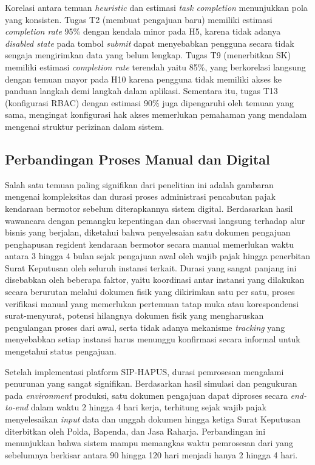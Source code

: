 \documentclass[conference]{IEEEtran}
\begin{document}
Korelasi antara temuan \emph{heuristic} dan estimasi \emph{task completion} menunjukkan
pola yang konsisten. Tugas T2 (membuat pengajuan baru) memiliki estimasi \emph{completion
rate} 95\% dengan kendala minor pada H5, karena tidak adanya \emph{disabled state} pada
tombol \emph{submit} dapat menyebabkan pengguna secara tidak sengaja mengirimkan data
yang belum lengkap. Tugas T9 (menerbitkan SK) memiliki estimasi \emph{completion rate}
terendah yaitu 85\%, yang berkorelasi langsung dengan temuan mayor pada H10 karena
pengguna tidak memiliki akses ke panduan langkah demi langkah dalam aplikasi. Sementara
itu, tugas T13 (konfigurasi RBAC) dengan estimasi 90\% juga dipengaruhi oleh temuan
yang sama, mengingat konfigurasi hak akses memerlukan pemahaman yang mendalam mengenai
struktur perizinan dalam sistem.

\subsection{Perbandingan Proses Manual dan Digital}
\label{subsec:perbandingan}

Salah satu temuan paling signifikan dari penelitian ini adalah gambaran mengenai
kompleksitas dan durasi proses administrasi pencabutan pajak kendaraan bermotor sebelum
diterapkannya sistem digital. Berdasarkan hasil wawancara dengan pemangku kepentingan
dan observasi langsung terhadap alur bisnis yang berjalan, diketahui bahwa penyelesaian
satu dokumen pengajuan penghapusan regident kendaraan bermotor secara manual memerlukan
waktu antara 3 hingga 4 bulan sejak pengajuan awal oleh wajib pajak hingga penerbitan
Surat Keputusan oleh seluruh instansi terkait. Durasi yang sangat panjang ini disebabkan
oleh beberapa faktor, yaitu koordinasi antar instansi yang dilakukan secara berurutan
melalui dokumen fisik yang dikirimkan satu per satu, proses verifikasi manual yang
memerlukan pertemuan tatap muka atau korespondensi surat-menyurat, potensi hilangnya
dokumen fisik yang mengharuskan pengulangan proses dari awal, serta tidak adanya mekanisme
\emph{tracking} yang menyebabkan setiap instansi harus menunggu konfirmasi secara informal
untuk mengetahui status pengajuan.

Setelah implementasi platform SIP-HAPUS, durasi pemrosesan mengalami penurunan yang sangat
signifikan. Berdasarkan hasil simulasi dan pengukuran pada \emph{environment} produksi,
satu dokumen pengajuan dapat diproses secara \emph{end-to-end} dalam waktu 2 hingga 4 hari
kerja, terhitung sejak wajib pajak menyelesaikan \emph{input} data dan unggah dokumen
hingga ketiga Surat Keputusan diterbitkan oleh Polda, Bapenda, dan Jasa Raharja.
Perbandingan ini menunjukkan bahwa sistem mampu memangkas waktu pemrosesan dari yang
sebelumnya berkisar antara 90 hingga 120 hari menjadi hanya 2 hingga 4 hari.
\end{document}
